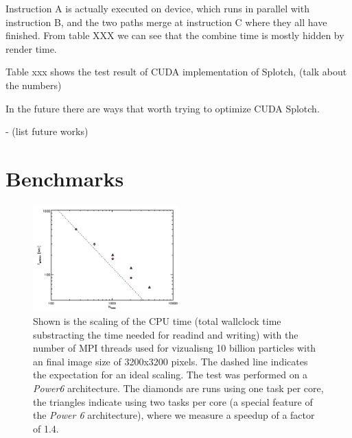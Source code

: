 Instruction A is actually executed on device, which runs in parallel with instruction B, and the two paths merge at instruction C where they all have finished. From table XXX we can see that the combine time is mostly hidden by render time. 

Table xxx shows the test result of CUDA implementation of Splotch, (talk about the numbers)

In the future there are ways that worth trying to optimize CUDA Splotch. 

- (list future works)


\section{Benchmarks}
\label{bench}

\begin{figure}
\begin{center}
\includegraphics[width=0.5\textwidth]{t_cpu.pdf}
\end{center}
\caption{Shown is the scaling of the CPU time (total wallclock time substracting the time needed for 
readind and writing) with the number of MPI threads used for vizualisng 10 billion particles with an final
image size of 3200x3200 pixels. The dashed line indicates the expectation for an ideal scaling. The test was 
performed on a {\it Power6} architecture. The diamonds are runs using one task per core, the triangles indicate
using two tasks per core (a special feature of the {\it Power 6} architecture), where we measure a speedup of 
a factor of 1.4.}\label{cpu_scaling}
\end{figure}


